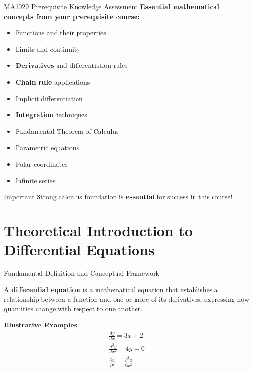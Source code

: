 \documentclass[10pt,aspectratio=169]{beamer}
\newcommand{\concept}[1]{\textbf{#1}}
\begin{document}
\begin{frame}{MA1029 Prerequisite Knowledge Assessment}
    \concept{Essential mathematical concepts from your prerequisite course:}
    
    \vspace{0.3cm}
    
    \begin{multicols}{2}
    \begin{itemize}
        \item Functions and their properties
        \item Limits and continuity
        \item \textbf{Derivatives} and differentiation rules
        \item \textbf{Chain rule} applications
        \item Implicit differentiation
        \item \textbf{Integration} techniques
        \item Fundamental Theorem of Calculus
        \item Parametric equations
        \item Polar coordinates
        \item Infinite series
    \end{itemize}
    \end{multicols}
    
    \vspace{0.3cm}
    
    \begin{alertblock}{Important}
        Strong calculus foundation is \textbf{essential} for success in this course!
    \end{alertblock}
\end{frame}

\section{Theoretical Introduction to Differential Equations}

\begin{frame}{Fundamental Definition and Conceptual Framework}
    \begin{definition}
        A \concept{differential equation} is a mathematical equation that establishes a relationship between a function and one or more of its derivatives, expressing how quantities change with respect to one another.
    \end{definition}
    
    \vspace{0.4cm}
    
    \textbf{Illustrative Examples:}
    \begin{align*}
        \frac{dy}{dx} = 3x + 2 \\  %
        \frac{d^2y}{dx^2} + 4y = 0 \\  %
        \frac{\partial u}{\partial t} = \frac{\partial^2 u}{\partial x^2}  %
    \end{align*}
\end{frame}
\end{document}
